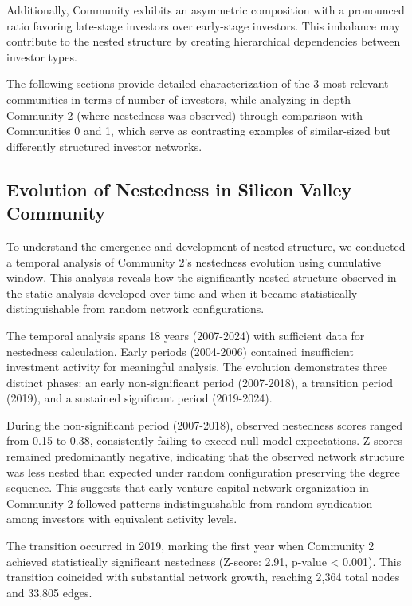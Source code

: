 Additionally, Community \interestingCommunity{} exhibits an asymmetric composition with a pronounced ratio favoring late-stage investors over early-stage investors. This imbalance may contribute to the nested structure by creating hierarchical dependencies between investor types.


The following sections provide detailed characterization of the 3 most relevant communities in terms of number of investors, while analyzing in-depth Community 2 (where nestedness was observed) through comparison with Communities 0 and 1, which serve as contrasting examples of similar-sized but differently structured investor networks.

\subsection{Evolution of Nestedness in Silicon Valley Community}

To understand the emergence and development of nested structure, we conducted a temporal analysis of Community 2's nestedness evolution using cumulative window. This analysis reveals how the significantly nested structure observed in the static analysis developed over time and when it became statistically distinguishable from random network configurations.

The temporal analysis spans 18 years (2007-2024) with sufficient data for nestedness calculation. Early periods (2004-2006) contained insufficient investment activity for meaningful analysis. The evolution demonstrates three distinct phases: an early non-significant period (2007-2018), a transition period (2019), and a sustained significant period (2019-2024).

During the non-significant period (2007-2018), observed nestedness scores ranged from 0.15 to 0.38, consistently failing to exceed null model expectations. Z-scores remained predominantly negative, indicating that the observed network structure was less nested than expected under random configuration preserving the degree sequence. This suggests that early venture capital network organization in Community 2 followed patterns indistinguishable from random syndication among investors with equivalent activity levels.

The transition occurred in 2019, marking the first year when Community 2 achieved statistically significant nestedness (Z-score: 2.91, p-value < 0.001). This transition coincided with substantial network growth, reaching 2,364 total nodes and 33,805 edges. 

